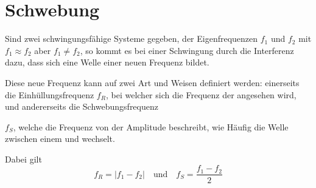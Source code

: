 \documentclass{article}
\begin{document}
\section{Schwebung}
\begin{minipage}{\dimexpr\linewidth-6.5cm} 
Sind zwei schwingungsfähige Systeme gegeben, der Eigenfrequenzen $f_1$ und $f_2$ mit ${f_1 \approx f_2}$ aber ${f_1 \ne f_2}$, so kommt es bei einer Schwingung durch die Interferenz dazu, dass sich eine Welle einer neuen Frequenz bildet.
 
Diese neue Frequenz kann auf zwei Art und Weisen definiert werden: einerseits die Einhüllungsfrequenz $f_R$, bei welcher sich die Frequenz der  angesehen wird, und andererseits die Schwebungsfrequenz \par \vspace{2pt}
 
\end{minipage}
\hfill 
\begin{minipage}{5.5cm}
 \center
\end{minipage}
 
\noindent $f_S$, welche die Frequenz von der Amplitude beschreibt, wie Häufig die Welle zwischen einem  und  wechselt. 
 
Dabei gilt
\[
 f_R = \vert f_1 - f_2 \vert
 \quad \text{und} \quad
 f_S = \frac{f_1 - f_2}{2} 
\] 
\end{document}
